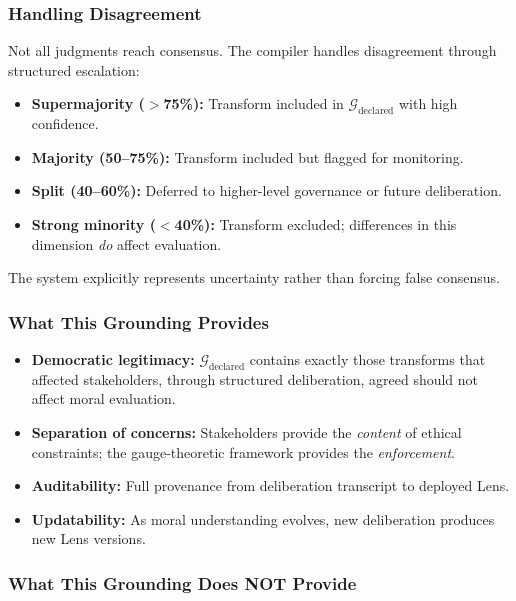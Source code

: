 \documentclass[12pt]{article}
\begin{document}
\subsubsection{Handling Disagreement}

Not all judgments reach consensus. The compiler handles disagreement through structured escalation:

\begin{itemize}
\item \textbf{Supermajority ($>$75\%):} Transform included in $\mathcal{G}_{\text{declared}}$ with high confidence.
\item \textbf{Majority (50--75\%):} Transform included but flagged for monitoring.
\item \textbf{Split (40--60\%):} Deferred to higher-level governance or future deliberation.
\item \textbf{Strong minority ($<$40\%):} Transform excluded; differences in this dimension \emph{do} affect
evaluation.
\end{itemize}

The system explicitly represents uncertainty rather than forcing false consensus.

\subsubsection{What This Grounding Provides}

\begin{itemize}
\item \textbf{Democratic legitimacy:} $\mathcal{G}_{\text{declared}}$ contains exactly those transforms that affected stakeholders, through structured deliberation, agreed should not affect moral evaluation.
\item \textbf{Separation of concerns:} Stakeholders provide the \emph{content} of ethical constraints; the gauge-theoretic framework provides the \emph{enforcement}.
\item \textbf{Auditability:} Full provenance from deliberation transcript to deployed Lens.
\item \textbf{Updatability:} As moral understanding evolves, new deliberation produces new Lens versions.
\end{itemize}

\subsubsection{What This Grounding Does NOT Provide}
\end{document}
